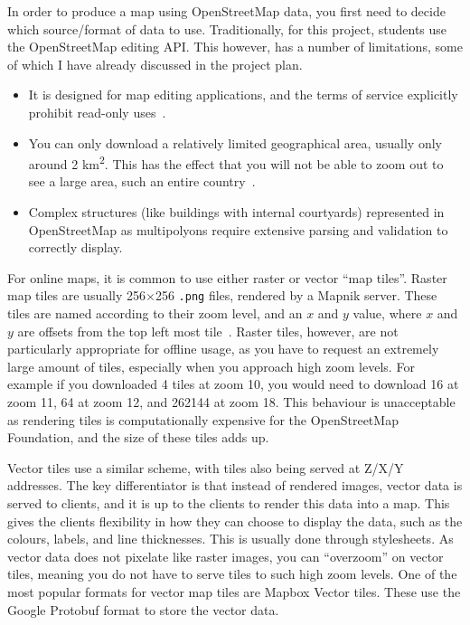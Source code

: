In order to produce a map using OpenStreetMap data, you first need to decide which source/format of data to use. Traditionally, for this project, students use the OpenStreetMap editing API\@. This however, has a number of limitations, some of which I have already discussed in the project plan.

\begin{itemize}
    \item It is designed for map editing applications, and the terms of service explicitly prohibit read-only uses~\cite{OSMF-tile-usage-policy}.
    \item You can only download a relatively limited geographical area, usually only around 2 km\textsuperscript{2}. This has the effect that you will not be able to zoom out to see a large area, such an entire country~\cite{osm-wiki-limited-area}.
    \item Complex structures (like buildings with internal courtyards) represented in OpenStreetMap as multipolyons require extensive parsing and validation to correctly display.
\end{itemize}

For online maps, it is common to use either raster or vector ``map tiles''. Raster map tiles are usually 256\(\times{}\)256 \texttt{.png} files, rendered by a Mapnik server. These tiles are named according to their zoom level, and an \(x\) and \(y\) value, where \(x\) and \(y\) are offsets from the top left most tile~\cite{osm-wiki-tile-names}. Raster tiles, however, are not particularly appropriate for offline usage, as you have to request an extremely large amount of tiles, especially when you approach high zoom levels. For example if you downloaded 4 tiles at zoom 10, you would need to download 16 at zoom 11, 64 at zoom 12, and 262144 at zoom 18. This behaviour is unacceptable as rendering tiles is computationally expensive for the OpenStreetMap Foundation, and the size of these tiles adds up.

Vector tiles use a similar scheme, with tiles also being served at Z/X/Y addresses. The key differentiator is that instead of rendered images, vector data is served to clients, and it is up to the clients to render this data into a map. This gives the clients flexibility in how they can choose to display the data, such as the colours, labels, and line thicknesses. This is usually done through stylesheets. As vector data does not pixelate like raster images, you can ``overzoom'' on vector tiles, meaning you do not have to serve tiles to such high zoom levels. One of the most popular formats for vector map tiles are Mapbox Vector tiles. These use the Google Protobuf format to store the vector data.

